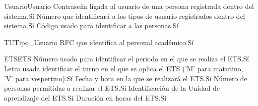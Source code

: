 \begin{cdtEntidad}{Usuario}{Usuario}
	{Contraseña ligada al usuario de una persona registrada dentro del sistema.}{Sí}
	{Número que identificará a los tipos de usuario registrados dentro del sistema.}{Sí}
	{Código usado para identificar a las personas.}{Sí}
\end{cdtEntidad}
\begin{cdtEntidad}{TU}{Tipo\_Usuario}
	{RFC que identifica al personal académico.}{Sí}
\end{cdtEntidad}
\begin{cdtEntidad}{ETS}{ETS}
	{Número usado para identificar el periodo en el que se realiza el ETS.}{Sí}
	{Letra usada identificar el turno en el que se aplica el ETS ('M' para matutino, 'V' para vespertino).}{Sí}
	{Fecha y hora en la que se realizará el ETS.}{Sí}
	{Número de personas permitidas a realizar el ETS.}{Sí}
	{Identificación de la Unidad de aprendizaje del ETS.}{Sí}
	{Duración en horas del ETS.}{Sí}
\end{cdtEntidad}
